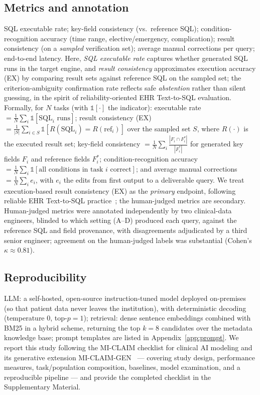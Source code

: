 \documentclass[11pt]{article}
\begin{document}
\subsection{Metrics and annotation}
SQL executable rate; key-field consistency (vs.\ reference SQL); condition-recognition accuracy
(time range, elective/emergency, complication); result consistency (on a \emph{sampled}
verification set); average manual corrections per query; end-to-end latency. Here, \emph{SQL
executable rate} captures whether generated SQL runs in the target engine, and \emph{result
consistency} approximates execution accuracy (EX) by comparing result sets against reference SQL on
the sampled set; the criterion-ambiguity confirmation rate reflects safe \emph{abstention} rather
than silent guessing, in the spirit of reliability-oriented EHR Text-to-SQL evaluation.
Formally, for $N$ tasks (with $\mathbb{1}[\cdot]$ the indicator): executable rate
$=\frac{1}{N}\sum_i \mathbb{1}[\text{SQL}_i\text{ runs}]$; result consistency (EX)
$=\frac{1}{|S|}\sum_{i\in S}\mathbb{1}[R(\text{SQL}_i)=R(\text{ref}_i)]$ over the sampled set $S$,
where $R(\cdot)$ is the executed result set; key-field consistency
$=\frac{1}{N}\sum_i \frac{|F_i\cap F_i^{*}|}{|F_i^{*}|}$ for generated key fields $F_i$ and reference
fields $F_i^{*}$; condition-recognition accuracy
$=\frac{1}{N}\sum_i \mathbb{1}[\text{all conditions in task }i\text{ correct}]$; and average manual
corrections $=\frac{1}{N}\sum_i e_i$, with $e_i$ the edits from first output to a deliverable query.
We treat
execution-based result consistency (EX) as the \emph{primary} endpoint, following reliable EHR
Text-to-SQL practice~\cite{ehrsql2024,ragepi2024}; the human-judged metrics are secondary. Human-judged
metrics were annotated independently by two clinical-data engineers, blinded to which setting (A--D)
produced each query, against the reference SQL and field provenance, with disagreements adjudicated by
a third senior engineer; agreement on the human-judged labels was substantial (Cohen's
$\kappa\approx0.81$).

\subsection{Reproducibility}
LLM: a self-hosted, open-source instruction-tuned model deployed on-premises (so that patient data
never leaves the institution), with deterministic decoding (temperature $0$, top-$p=1$);
retrieval: dense sentence embeddings combined with BM25 in a hybrid scheme, returning the top
$k{=}8$ candidates over the metadata knowledge base; prompt templates are listed in
Appendix~\ref{app:prompt}.
We report this study following the MI-CLAIM checklist for clinical AI modeling and its generative
extension MI-CLAIM-GEN~\cite{miclaim2020,miclaimgen2024} --- covering study design, performance
measures, task/population composition, baselines, model examination, and a reproducible pipeline ---
and provide the completed checklist in the Supplementary Material.
\end{document}
